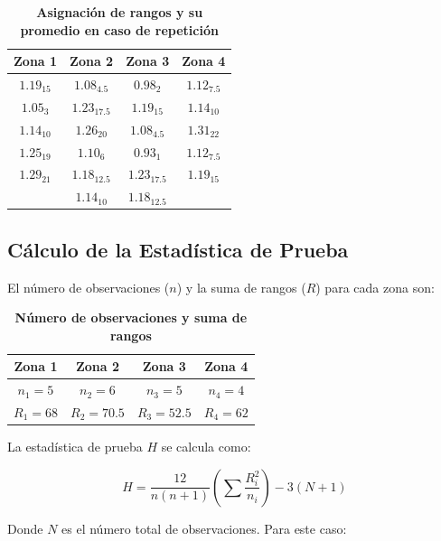 \documentclass{article}
\begin{document}
\begin{table}[ht]
    \centering
    \caption{\textbf{Asignación de rangos y su promedio en caso de repetición}}
    \begin{tabular}{cccc}
        \toprule
        Zona 1      & Zona 2        & Zona 3        & Zona 4       \\
        \midrule
        $1.19_{15}$ & $1.08_{4.5}$  & $0.98_{2}$    & $1.12_{7.5}$ \\
        $1.05_{3}$  & $1.23_{17.5}$ & $1.19_{15}$   & $1.14_{10}$  \\
        $1.14_{10}$ & $1.26_{20}$   & $1.08_{4.5}$  & $1.31_{22}$  \\
        $1.25_{19}$ & $1.10_{6}$    & $0.93_{1}$    & $1.12_{7.5}$ \\
        $1.29_{21}$ & $1.18_{12.5}$ & $1.23_{17.5}$ & $1.19_{15}$  \\
                    & $1.14_{10}$   & $1.18_{12.5}$ &              \\
        \bottomrule
    \end{tabular}
\end{table}

\subsection*{Cálculo de la Estadística de Prueba}

El número de observaciones ($n$) y la suma de rangos ($R$) para cada zona son:

\begin{table}[ht]
    \centering
    \caption{\textbf{Número de observaciones y suma de rangos}}
    \begin{tabular}{cccc}
        \toprule
        Zona 1     & Zona 2       & Zona 3       & Zona 4     \\
        \midrule
        $n_1 = 5$  & $n_2 = 6$    & $n_3 = 5$    & $n_4 = 4$  \\
        $R_1 = 68$ & $R_2 = 70.5$ & $R_3 = 52.5$ & $R_4 = 62$ \\
        \bottomrule
    \end{tabular}
\end{table}

La estadística de prueba $H$ se calcula como:

\[ H = \frac{12}{n(n + 1)} \left(\sum \frac{R_i^2}{n_i}\right) - 3(N + 1) \]

Donde $N$ es el número total de observaciones. Para este caso:
\end{document}
